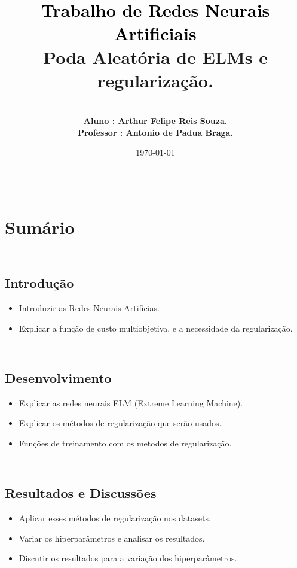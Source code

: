 \documentclass{article}
\title{\textcolor{black}{\Huge\bfseries Trabalho de Redes Neurais Artificiais}\\[100pt]
{\huge\bfseries Poda Aleatória de ELMs e regularização.}} %
\author{\\[50pt]{\bfseries Aluno : Arthur Felipe Reis Souza.} \\[50pt]
{\bfseries Professor : Antonio de Padua Braga.} \\[ 50pt]}
\date{\today}
\begin{document}
\maketitle %

\newpage

\pagestyle{fancy} %

\section*{\\[50pt] Sumário}

\subsection*{\\[30pt] Introdução}
\begin{itemize}
    \item Introduzir as Redes Neurais Artificias.
    \item Explicar a função de custo multiobjetiva, e a necessidade da regularização.
\end{itemize}

\subsection*{\\[30pt] Desenvolvimento}
\begin{itemize}
    \item Explicar as redes neurais ELM (Extreme Learning Machine).
    \item Explicar os métodos de regularização que serão usados.
    \item Funções de treinamento com os metodos de regularização.
\end{itemize}

\subsection*{\\[30pt] Resultados e Discussões}
\begin{itemize}
    \item Aplicar esses métodos de regularização nos datasets.
    \item Variar os hiperparâmetros e analisar os resultados.
    \item Discutir os resultados para a variação dos hiperparâmetros.
\end{itemize}
\end{document}
